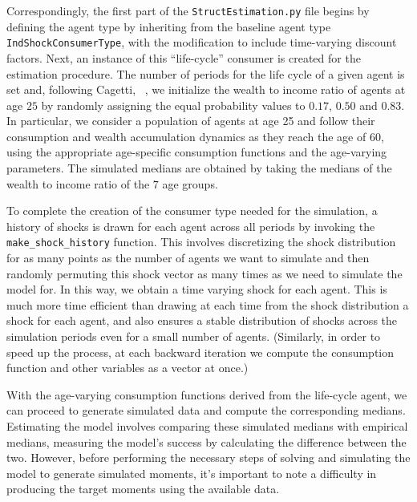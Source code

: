\documentclass[SolvingMicroDSOPs]{subfiles}
\begin{document}
Correspondingly, the first part of the \texttt{StructEstimation.py} file begins by defining the agent type by inheriting from the baseline agent type \texttt{IndShockConsumerType}, with the modification to include time-varying discount factors. Next, an instance of this ``life-cycle'' consumer is created for the estimation procedure.  The number of periods for the life cycle of a given agent is set and, following Cagetti, ~\citeyearpar{cagettiWprofiles}, we initialize the wealth to income ratio of agents at age $25$ by randomly assigning the equal probability values to $0.17$, $0.50$ and $0.83$. In particular, we consider a population of agents at age 25 and follow their consumption and wealth accumulation dynamics as they reach the age of $60$, using the appropriate age-specific consumption functions and the age-varying parameters. The simulated medians are obtained by taking the medians of the wealth to income ratio of the $7$ age groups.

To complete the creation of the consumer type needed for the simulation, a history of shocks is drawn for each agent across all periods by invoking the \texttt{make\_shock\_history} function. This involves discretizing the shock distribution for as many points as the number of agents we want to simulate and then randomly permuting this shock vector as many times as we need to simulate the model for. In this way, we obtain a time varying shock for each agent. This is much more time efficient than drawing at each time from the shock distribution a shock for each agent, and also ensures a stable distribution of shocks across the simulation periods even for a small number of agents. (Similarly, in order to speed up the process, at each backward iteration we compute the consumption function and other variables as a vector at once.)

With the age-varying consumption functions derived from the life-cycle agent, we can proceed to generate simulated data and compute the corresponding medians.  Estimating the model involves comparing these simulated medians with empirical medians, measuring the model's success by calculating the difference between the two.  However, before performing the necessary steps of solving and simulating the model to generate simulated moments, it's important to note a difficulty in producing the target moments using the available data.
\end{document}
